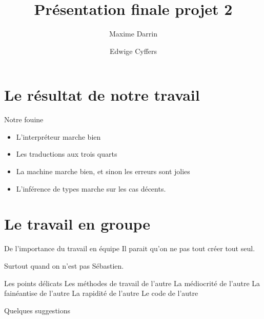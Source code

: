 \documentclass{beamer}
\title{Présentation finale projet 2}
\author{Maxime Darrin  \and Edwige Cyffers }
\institute{}
\date{}
\begin{document}
\maketitle

\tableofcontents

\section{Le résultat de notre travail}

\begin{frame}{Notre fouine}

  \begin{itemize}
  \item L'interpréteur marche bien \pause
  \item Les traductions aux trois quarts \pause
  \item La machine marche bien, et sinon les erreurs sont jolies \pause
  \item L'inférence de types marche sur les cas décents.\pause

  \end{itemize}
  
\end{frame}

\section{Le travail en groupe}

\begin{frame}{De l'importance du travail en équipe}
	Il parait qu'on ne pas tout créer tout seul. 
	
	Surtout quand on n'est pas Sébastien.
\end{frame}

\begin{frame}{Les points délicats}
	Les méthodes de travail de l'autre
	La médiocrité de l'autre
	La fainéantise de l'autre
	La rapidité de l'autre
	Le code de l'autre
	
\end{frame}

\begin{frame}{Quelques suggestions}

\end{frame}
\end{document}
